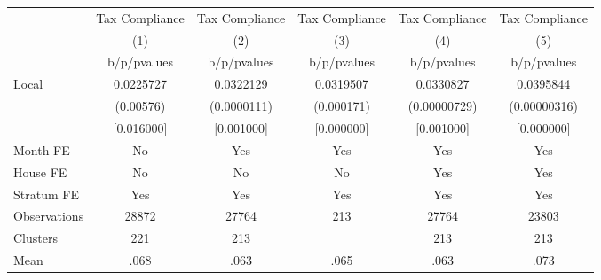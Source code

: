 {
\def\sym#1{\ifmmode^{#1}\else\(^{#1}\)\fi}
\begin{tabular}{l*{5}{c}}
\toprule
                &\multicolumn{1}{c}{Tax Compliance}&\multicolumn{1}{c}{Tax Compliance}&\multicolumn{1}{c}{Tax Compliance}&\multicolumn{1}{c}{Tax Compliance}&\multicolumn{1}{c}{Tax Compliance}\\
                &\multicolumn{1}{c}{(1)}&\multicolumn{1}{c}{(2)}&\multicolumn{1}{c}{(3)}&\multicolumn{1}{c}{(4)}&\multicolumn{1}{c}{(5)}\\
                &b/p/pvalues&b/p/pvalues&b/p/pvalues&b/p/pvalues&b/p/pvalues\\
\midrule
Local           &0.0225727&0.0322129&0.0319507&0.0330827&0.0395844\\
                &(0.00576)&(0.0000111)&(0.000171)&(0.00000729)&(0.00000316)\\
                &[0.016000]&[0.001000]&[0.000000]&[0.001000]&[0.000000]\\
Month FE        &       No&      Yes&      Yes&      Yes&      Yes\\
House FE        &       No&       No&       No&      Yes&      Yes\\
Stratum FE      &      Yes&      Yes&      Yes&      Yes&      Yes\\
\midrule
Observations    &    28872&    27764&      213&    27764&    23803\\
Clusters        &      221&      213&         &      213&      213\\
Mean            &     .068&     .063&     .065&     .063&     .073\\
\bottomrule
\end{tabular}
}
